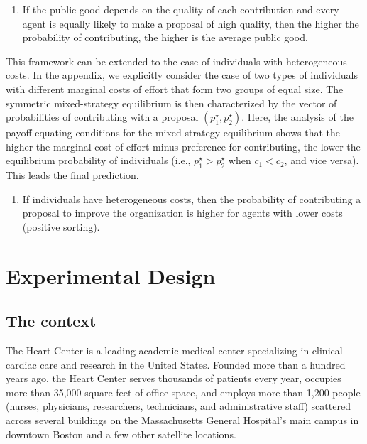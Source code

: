 \documentclass[12pt, titlepage]{article}
\providecommand{\tightlist}{%
  \setlength{\itemsep}{0pt}\setlength{\parskip}{0pt}}
\begin{document}
\begin{enumerate}
\def\labelenumi{\arabic{enumi})}
\setcounter{enumi}{3}
\tightlist
\item
  If the public good depends on the quality of each contribution and
  every agent is equally likely to make a proposal of high quality, then
  the higher the probability of contributing, the higher is the average
  public good.
\end{enumerate}

This framework can be extended to the case of individuals with
heterogeneous costs. In the appendix, we explicitly consider the case of
two types of individuals with different marginal costs of effort that
form two groups of equal size. The symmetric mixed-strategy equilibrium
is then characterized by the vector of probabilities of contributing
with a proposal \((p_1^\star, p_2^\star)\). Here, the analysis of the
payoff-equating conditions for the mixed-strategy equilibrium shows that
the higher the marginal cost of effort minus preference for
contributing, the lower the equilibrium probability of individuals
(i.e., \(p_1^\star > p_2^\star\) when \(c_1 < c_2\), and vice versa).
This leads the final prediction.

\begin{enumerate}
\def\labelenumi{\arabic{enumi})}
\setcounter{enumi}{4}
\tightlist
\item
  If individuals have heterogeneous costs, then the probability of
  contributing a proposal to improve the organization is higher for
  agents with lower costs (positive sorting).
\end{enumerate}

\section{Experimental Design}\label{experimental-design}

\subsection{The context}\label{the-context}

The Heart Center is a leading academic medical center specializing in
clinical cardiac care and research in the United States. Founded more
than a hundred years ago, the Heart Center serves thousands of patients
every year, occupies more than 35,000 square feet of office space, and
employs more than 1,200 people (nurses, physicians, researchers,
technicians, and administrative staff) scattered across several
buildings on the Massachusetts General Hospital's main campus in
downtown Boston and a few other satellite locations.
\end{document}
